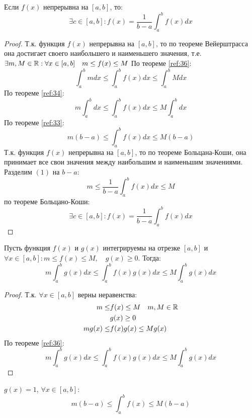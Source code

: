 \begin{theorem}
  Если $f(x)$ непрерывна на $[a, b]$, то: \[
    \exists c \in [a, b] : f(x) = \frac{1}{b - a} \int_a^b f(x) dx
  \] 
\end{theorem}
\begin{proof}
  Т.к. функция $f(x)$ непрерывна на $[a, b]$, то по теореме Вейерштрасса она достигает своего наибольшего и наименьшего значения, т.е. $\exists m, M \in \mathbb{R} : \forall x \in [a, b] \quad m \le f(x) \le M$
  По теореме \ref{ref:36}:  \[
  \int_a^b mdx \le \int_a^b f(x) dx \le \int_a^b Mdx
  \] 
  По теореме \ref{ref:34}: \[
    m \int_a^b dx \le \int_a^b f(x) dx \le M \int_a^b dx
  \]
  По теореме \ref{ref:33}: \[
    m(b - a) \le \int_a^b f(x) dx \le M(b - a) \tag{1} 
  \] 
  Т.к. функция $f(x)$ непрерывна на  $[a, b]$, то по теореме Больцана-Коши, она принимает все свои значения между наибольшим и наименьшим значениями. Разделим $(1)$ на  $b - a$:  \[
  m \le \frac{1}{b - a} \int_a^b f(x) dx \le M
  \] 
  по теореме Больцано-Коши: \[
    \exists c \in [a, b] : f(x) = \frac{1}{b - a} \int_a^b f(x) dx
  \]
\end{proof}

\begin{theorem}
  \label{th:39}
  Пусть функция $f(x)$ и $g(x)$ интегрируемы на отрезке $[a, b]$ и  $\forall x \in [a, b] : m \le f(x) \le M, \quad g(x) \ge 0$.
  Тогда: \[
    m \int_a^b g(x) dx \le \int_a^b f(x) g(x) dx \le M \int_a^b g(x) dx
  \]
\end{theorem}

\begin{proof}
  Т.к. $\forall x \in [a, b]$ верны неравенства:
  \begin{align*}
    m \le  &f(x) \le M \quad m, M \in \mathbb{R} \\
         &g(x) \ge 0 \\
    mg(x) \le &f(x)g(x) \le M g(x)
  \end{align*}
  По теореме \ref{ref:36}: \[
    m \int_a^b g(x) dx \le \int_a^b f(x) g(x) dx \le M \int_a^b g(x) dx
  \] 
\end{proof}

\begin{consequence}
  $g(x) = 1$, $\forall x \in [a, b]$: \[
    m\left( b - a \right)   \le \int_a^b f(x) \le M(b - a)
  \] 
\end{consequence}



